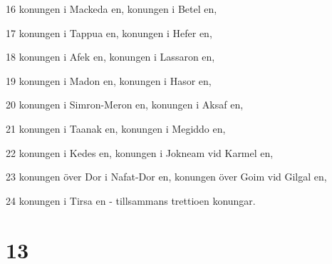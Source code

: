\par 16 konungen i Mackeda en, konungen i Betel en,
\par 17 konungen i Tappua en, konungen i Hefer en,
\par 18 konungen i Afek en, konungen i Lassaron en,
\par 19 konungen i Madon en, konungen i Hasor en,
\par 20 konungen i Simron-Meron en, konungen i Aksaf en,
\par 21 konungen i Taanak en, konungen i Megiddo en,
\par 22 konungen i Kedes en, konungen i Jokneam vid Karmel en,
\par 23 konungen över Dor i Nafat-Dor en, konungen över Goim vid Gilgal en,
\par 24 konungen i Tirsa en - tillsammans trettioen konungar.

\chapter{13}


